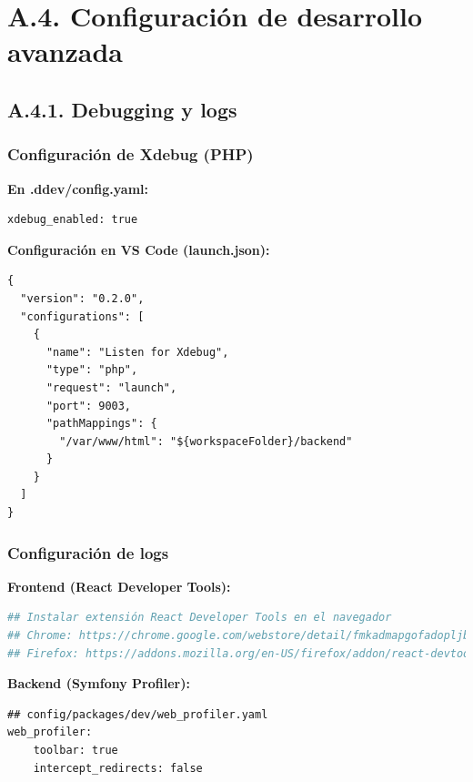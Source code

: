 \documentclass[12pt,a4paper,oneside]{report}
\begin{document}
{\section{A.4. Configuración de desarrollo
avanzada}\label{a.4.-configuraciuxf3n-de-desarrollo-avanzada}

\subsection{A.4.1. Debugging y logs}\label{a.4.1.-debugging-y-logs}

\subsubsection{Configuración de Xdebug
(PHP)}\label{configuraciuxf3n-de-xdebug-php}

\textbf{En .ddev/config.yaml:}

\begin{lstlisting}
xdebug_enabled: true
\end{lstlisting}

\textbf{Configuración en VS Code (launch.json):}

\begin{lstlisting}
{
  "version": "0.2.0",
  "configurations": [
    {
      "name": "Listen for Xdebug",
      "type": "php",
      "request": "launch",
      "port": 9003,
      "pathMappings": {
        "/var/www/html": "${workspaceFolder}/backend"
      }
    }
  ]
}
\end{lstlisting}

\subsubsection{Configuración de logs}\label{configuraciuxf3n-de-logs}

\textbf{Frontend (React Developer Tools):}

\begin{lstlisting}[language=bash]
## Instalar extensión React Developer Tools en el navegador
## Chrome: https://chrome.google.com/webstore/detail/fmkadmapgofadopljbjfkapdkoienihi
## Firefox: https://addons.mozilla.org/en-US/firefox/addon/react-devtools/
\end{lstlisting}

\textbf{Backend (Symfony Profiler):}

\begin{lstlisting}
## config/packages/dev/web_profiler.yaml
web_profiler:
    toolbar: true
    intercept_redirects: false
\end{lstlisting}

}
\end{document}
